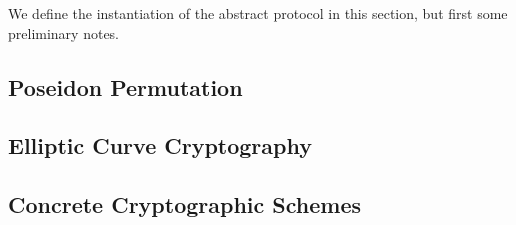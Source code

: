 
We define the instantiation of the abstract protocol in this section, but first some preliminary notes.

\subsection{Poseidon Permutation}


\subsection{Elliptic Curve Cryptography}


\subsection{Concrete Cryptographic Schemes}

